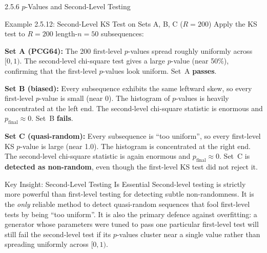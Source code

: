 \documentclass[aspectratio=169,10pt]{beamer}
\begin{document}
\begin{frame}[allowframebreaks]{2.5.6 $p$-Values and Second-Level Testing}
\begin{exampleblock}{Example 2.5.12: Second-Level KS Test on Sets A, B, C ($R=200$)}
Apply the KS test to $R = 200$ length-$n = 50$ subsequences:

\textbf{Set A (PCG64):} The 200 first-level $p$-values spread roughly
uniformly across $[0,1)$.  The second-level chi-square test gives a large
$p$-value (near 50\%), confirming that the first-level $p$-values look
uniform.  Set~A \textbf{passes}.

\textbf{Set B (biased):} Every subsequence exhibits the same leftward skew,
so every first-level $p$-value is small (near 0).  The histogram of $p$-values
is heavily concentrated at the left end.  The second-level chi-square statistic
is enormous and $p_{\mathrm{final}} \approx 0$.  Set~B \textbf{fails}.

\textbf{Set C (quasi-random):} Every subsequence is ``too uniform'', so
every first-level KS $p$-value is large (near 1.0).  The histogram is
concentrated at the right end.  The second-level chi-square statistic is
again enormous and $p_{\mathrm{final}} \approx 0$.  Set~C is
\textbf{detected as non-random}, even though the first-level KS test did
not reject it.
\end{exampleblock}

\begin{alertblock}{Key Insight: Second-Level Testing Is Essential}
Second-level testing is strictly more powerful than first-level testing
for detecting subtle non-randomness.  It is the \emph{only} reliable
method to detect quasi-random sequences that fool first-level tests by
being ``too uniform''.  It is also the primary defence against overfitting:
a generator whose parameters were tuned to pass one particular first-level
test will still fail the second-level test if its $p$-values cluster
near a single value rather than spreading uniformly across $[0,1)$.
\end{alertblock}

\end{frame}
\end{document}
